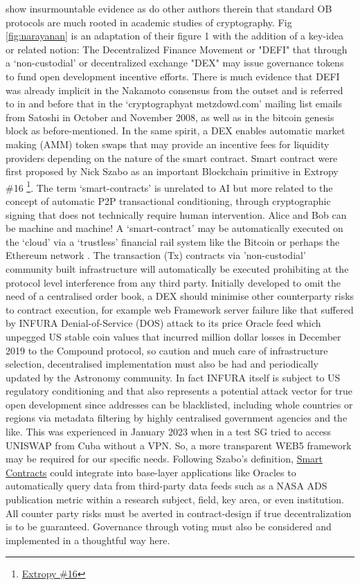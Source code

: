 \documentclass[final,5p,times,twocolumn,authoryear]{elsarticle}
\begin{document}
\cite{arvindandclark2017} show insurmountable evidence as do other authors therein that standard OB protocols are much rooted in academic studies of cryptography. Fig \ref{fig:narayanan} is an adaptation of their figure 1 with the addition of a key-idea or related notion: The Decentralized Finance Movement or "DEFI" that through a `non-custodial' or decentralized exchange "DEX" may issue governance tokens to fund open development incentive efforts. There is much evidence that DEFI was already implicit in the Nakamoto consensus from the outset and is referred to in \cite{nak2009} and before that in the `cryptographyat metzdowd.com' mailing list emails from Satoshi in October and November 2008, as well as in the bitcoin genesis block as before-mentioned. In the same spirit, a DEX enables automatic market making (AMM) token swaps that may provide an incentive fees for liquidity providers depending on the nature of the smart contract. Smart contract were first proposed by Nick Szabo as an important Blockchain primitive in Extropy \#16 \footnote{\href{ https://archive.org/details/extropy-16}{Extropy \#16}}. The term `smart-contracts' is unrelated to AI but more related to the concept of automatic P2P transactional conditioning, through cryptographic signing that does not technically require human intervention. Alice and Bob can be machine and machine!  A `smart-contract' may be automatically executed on the `cloud' via a `trustless' financial rail system like the Bitcoin or perhaps the Ethereum network \citep{antono_me19}. The transaction (Tx) contracts via 'non-custodial' community built infrastructure will automatically be executed prohibiting at the protocol level interference from any third party. Initially developed to omit the need of a centralised order book, a DEX should minimise other counterparty risks to contract execution, for example web Framework server failure like that suffered by INFURA Denial-of-Service (DOS) attack to its price Oracle feed which unpegged US stable coin values that incurred million dollar losses in December 2019 to the Compound protocol, so caution and much care of infrastructure selection, decentralised implementation must also be had and periodically updated by the Astronomy community. In fact INFURA itself is subject to US regulatory conditioning and that also represents a potential attack vector for true open development since addresses can be blacklisted, including whole countries or regions via metadata filtering by highly centralised government agencies and the like. This was experienced in January 2023 when in a test SG tried to access UNISWAP from Cuba without a VPN. So, a more transparent WEB5 framework may be required for our specific needs. Following Szabo's definition, \href{https://www.fon.hum.uva.nl/rob/Courses/InformationInSpeech/CDROM/Literature/LOTwinterschool2006/szabo.best.vwh.net/smart.contracts.html}{Smart Contracts} could integrate into base-layer applications like Oracles to automatically query data from third-party data feeds such as a NASA ADS publication metric within a research subject, field, key area,  or even institution. All counter party risks must be averted in contract-design if true decentralization is to be guaranteed. Governance through voting must also be considered and implemented in a thoughtful way here. 
\end{document}

